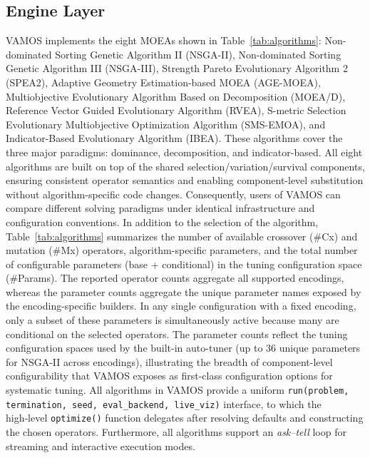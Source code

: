 \documentclass[journal]{IEEEtran}
\begin{document}
\subsection{Engine Layer}

VAMOS implements the eight MOEAs shown in Table~\ref{tab:algorithms}: Non-dominated Sorting Genetic Algorithm II (NSGA-II), Non-dominated Sorting Genetic Algorithm III (NSGA-III), Strength Pareto Evolutionary Algorithm 2 (SPEA2), Adaptive Geometry Estimation-based MOEA (AGE-MOEA), Multiobjective Evolutionary Algorithm Based on Decomposition (MOEA/D), Reference Vector Guided Evolutionary Algorithm (RVEA), S-metric Selection Evolutionary Multiobjective Optimization Algorithm (SMS-EMOA), and Indicator-Based Evolutionary Algorithm (IBEA). These algorithms cover the three major paradigms: dominance, decomposition, and indicator-based. All eight algorithms are built on top of the shared selection/variation/survival components, ensuring consistent operator semantics and enabling component-level substitution without algorithm-specific code changes. Consequently, users of VAMOS can compare different solving paradigms under identical infrastructure and configuration conventions. In addition to the selection of the algorithm, Table~\ref{tab:algorithms} summarizes the number of available crossover (\#Cx) and mutation (\#Mx) operators, algorithm-specific parameters, and the total number of configurable parameters (base + conditional) in the tuning configuration space (\#Params). The reported operator counts aggregate all supported encodings, whereas the parameter counts aggregate the unique parameter names exposed by the encoding-specific builders. In any single configuration with a fixed encoding, only a subset of these parameters is simultaneously active because many are conditional on the selected operators. The parameter counts reflect the tuning configuration spaces used by the built-in auto-tuner (up to 36 unique parameters for NSGA-II across encodings), illustrating the breadth of component-level configurability that VAMOS exposes as first-class configuration options for systematic tuning. All algorithms in VAMOS provide a uniform \texttt{run(problem, termination, seed, eval\_backend, live\_viz)} interface, to which the high‑level \texttt{optimize()} function delegates after resolving defaults and constructing the chosen operators. Furthermore, all algorithms support an \emph{ask–tell} loop for streaming and interactive execution modes.
\end{document}
